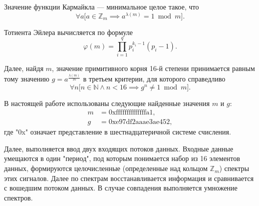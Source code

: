 Значение функции Кармайкла --– минимальное целое такое, что
$$
\forall a\big[a \in \mathbb{Z}_m \implies a^{\lambda(m)} = 1 \bmod{m}\big].
$$

Тотиента Эйлера вычисляется по формуле
$$
\varphi(m) = \prod_{i=1}^q p_i^{k_i - 1} (p_i - 1).
$$

Далее, найдя $m$, значение примитивного корня 16-й степени принимается равным тому значению $g=a^\frac{\lambda(m)}{16}$ в третьем критерии, для которого справедливо
$$
\forall n\big[n\in\mathbb{N} \land n < 16 \implies g^n \ne 1 \bmod{m}\big].
$$

В настоящей работе  использованы следующие найденные значения $m$ и $g$:
\begin{align*}
m &= \textrm{0xffffffffffffffa1}, \\
g &= \textrm{0xe97df2aaae3ae452},
\end{align*}
где "0x" означает представление в шестнадцатеричной системе счисления.

Далее, выполняется ввод двух входящих потоков данных.
Входные данные умещаются в один "период", под которым понимается набор из 16 элементов данных, формируются целочисленные (определенные над кольцом $\mathbb{Z}_m$) спектры этих сигналов.
Далее по спектрам восстанавливается информация и сравнивается с вошедшим потоком данных. В случае совпадения выполняется умножение спектров.

